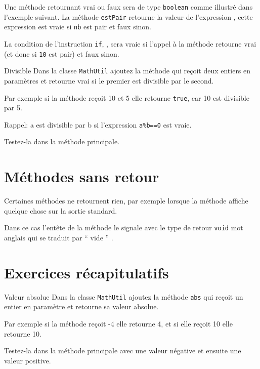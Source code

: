 \documentclass[a4paper,11pt]{style-esi/td}
\begin{document}
	Une méthode retournant vrai ou faux sera de type \texttt{boolean} comme illustré dans l'exemple suivant.
	La méthode \texttt{estPair} retourne la valeur de l'expression , 
	cette expression est vraie si \texttt{nb} est pair et faux sinon.
	
	La condition de l'instruction \texttt{if}, , sera vraie si l'appel à la méthode retourne vrai (et donc si \texttt{10} est pair)
	 et faux sinon.

	 \begin{Exercice}{Divisible}
		Dans la classe \texttt{MathUtil} ajoutez la méthode 
		 qui reçoit deux entiers en paramètres et 
		retourne vrai si le premier est divisible par le second.
		
		Par exemple si la méthode reçoit 10 et 5 elle retourne \texttt{true}, car 10 est divisible par 5.
		
		Rappel: a est divisible par b si l'expression \texttt{a\%b==0} est vraie.
		
		Testez-la dans la méthode principale.
	\end{Exercice} 

\section{Méthodes sans retour}
	
	Certaines méthodes ne retournent rien,
	par exemple lorsque la méthode affiche quelque chose sur la sortie standard.

	Dans ce cas l'entête de la méthode le signale avec le type de retour \texttt{void}
	mot anglais qui se traduit par `` vide '' .
	
	

	
\section{Exercices récapitulatifs}
				
	 \begin{Exercice}{Valeur absolue}	
		Dans la classe \texttt{MathUtil} ajoutez la méthode 
		\texttt{abs} qui reçoit un entier en paramètre et retourne sa valeur absolue.
		
		Par exemple si la méthode reçoit -4 elle retourne 4, et si elle reçoit 10 elle retourne 10.
		
		Testez-la dans la méthode principale avec une valeur négative et ensuite une valeur positive.
		
	\end{Exercice} 
					
\end{document}
